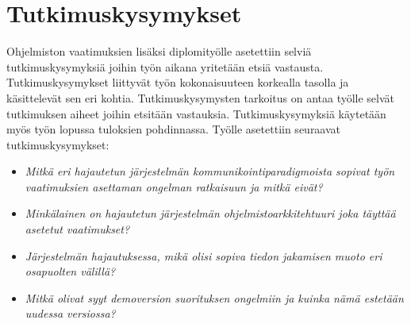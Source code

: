\section{Tutkimuskysymykset}
Ohjelmiston vaatimuksien lisäksi diplomityölle asetettiin selviä tutkimuskysymyksiä joihin työn aikana yritetään etsiä vastausta. Tutkimuskysymykset liittyvät työn kokonaisuuteen korkealla tasolla ja käsittelevät sen eri kohtia. Tutkimuskysymysten tarkoitus on antaa työlle selvät tutkimuksen aiheet joihin etsitään vastauksia. Tutkimuskysymyksiä käytetään myös työn lopussa tuloksien pohdinnassa. Työlle asetettiin seuraavat tutkimuskysymykset:
\begin{itemize}
	\item \emph{Mitkä eri hajautetun järjestelmän kommunikointiparadigmoista sopivat työn vaatimuksien asettaman ongelman ratkaisuun ja mitkä eivät?}
	\item \emph{Minkälainen on hajautetun järjestelmän ohjelmistoarkkitehtuuri joka täyttää asetetut vaatimukset?}
	\item \emph{Järjestelmän hajautuksessa, mikä olisi sopiva tiedon jakamisen muoto eri osapuolten välillä?}
	\item \emph{Mitkä olivat syyt demoversion suorituksen ongelmiin ja kuinka nämä estetään uudessa versiossa?}
\end{itemize}